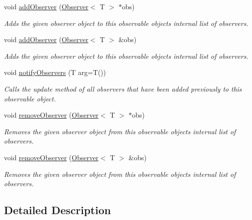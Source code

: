 \begin{DoxyCompactItemize}
\item 
void \mbox{\hyperlink{classObservable_a7fa6df797eb4680c2776371f2937a1b2}{add\+Observer}} (\mbox{\hyperlink{classObserver}{Observer}}$<$ T $>$ $\ast$obs)
\begin{DoxyCompactList}\small\item\em Adds the given observer object to this observable object\textquotesingle{}s internal list of observers. \end{DoxyCompactList}\item 
void \mbox{\hyperlink{classObservable_a49fbc8dd9a3300429f7f575dc7ba0be8}{add\+Observer}} (\mbox{\hyperlink{classObserver}{Observer}}$<$ T $>$ \&obs)
\begin{DoxyCompactList}\small\item\em Adds the given observer object to this observable object\textquotesingle{}s internal list of observers. \end{DoxyCompactList}\item 
void \mbox{\hyperlink{classObservable_a337380718b992689248fac2927145c62}{notify\+Observers}} (T arg=T())
\begin{DoxyCompactList}\small\item\em Calls the update method of all observers that have been added previously to this observable object. \end{DoxyCompactList}\item 
void \mbox{\hyperlink{classObservable_a2fbb493a74c7c4a7604326bffcd75dbd}{remove\+Observer}} (\mbox{\hyperlink{classObserver}{Observer}}$<$ T $>$ $\ast$obs)
\begin{DoxyCompactList}\small\item\em Removes the given observer object from this observable object\textquotesingle{}s internal list of observers. \end{DoxyCompactList}\item 
void \mbox{\hyperlink{classObservable_a36b9c4607c1cab08dc800daa5aa38b82}{remove\+Observer}} (\mbox{\hyperlink{classObserver}{Observer}}$<$ T $>$ \&obs)
\begin{DoxyCompactList}\small\item\em Removes the given observer object from this observable object\textquotesingle{}s internal list of observers. \end{DoxyCompactList}\end{DoxyCompactItemize}


\subsection{Detailed Description}
